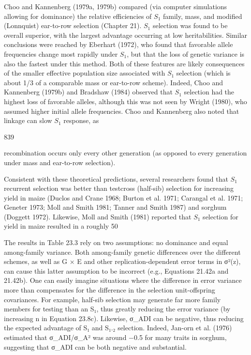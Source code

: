 \documentclass{article}
\begin{document}
Choo and Kannenberg (1979a, 1979b) compared (via computer simulations allowing for dominance) the relative efficiencies of  $ S_{1} $ family, mass, and modified (Lonnquist) ear-to-row selection (Chapter 21).  $ S_{1} $ selection was found to be overall superior, with the largest advantage occurring at low heritabilities. Similar conclusions were reached by Eberhart (1972), who found that favorable allele frequencies change most rapidly under  $ S_{1} $, but that the loss of genetic variance is also the fastest under this method. Both of these features are likely consequences of the smaller effective population size associated with  $ S_{1} $ selection (which is about 1/3 of a comparable mass or ear-to-row scheme). Indeed, Choo and Kannenberg (1979b) and Bradshaw (1984) observed that  $ S_{1} $ selection had the highest loss of favorable alleles, although this was not seen by Wright (1980), who assumed higher initial allele frequencies. Choo and Kannenberg also noted that linkage can slow  $ S_{1} $ response, as

839

recombination occurs only every other generation (as opposed to every generation under mass and ear-to-row selection).

Consistent with these theoretical predictions, several researchers found that  $ S_{1} $ recurrent selection was better than testcross (half-sib) selection for increasing yield in maize (Duclos and Crane 1968; Burton et al. 1971; Carangal et al. 1971; Geneter 1973; Moll and Smith 1981; Tanner and Smith 1987) and sorghum (Doggett 1972). Likewise, Moll and Smith (1981) reported that  $ S_{1} $ selection for yield in maize resulted in a roughly 50%

The results in Table 23.3 rely on two assumptions: no dominance and equal among-family variance. Both among-family genetic differences over the different schemes, as well as G × E and other replication-dependent error terms in σ²(z), can cause this latter assumption to be incorrect (e.g., Equations 21.42a and 21.42b). One can easily imagine situations where the difference in error variance more than compensates for the difference in the selection unit-offspring covariances. For example, half-sib selection may generate far more family members for testing than an S₁, thus greatly reducing the error variance (by increasing n in Equation 23.8c). Likewise, σ_ADI can be negative, thus reducing the expected advantage of S₁ and S₁.₂ selection. Indeed, Jan-orn et al. (1976) estimated that σ_ADI/σ_A² was around −0.5 for many traits in sorghum, suggesting that σ_ADI can be both negative and substantial.
\end{document}
